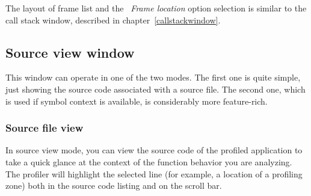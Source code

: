\documentclass[hidelinks,titlepage,a4paper]{article}
\begin{document}
The layout of frame list and the \emph{\faAt{}~Frame location} option selection is similar to the call stack window, described in chapter~\ref{callstackwindow}.

\subsection{Source view window}
\label{sourceview}

This window can operate in one of the two modes. The first one is quite simple, just showing the source code associated with a source file. The second one, which is used if symbol context is available, is considerably more feature-rich.

\subsubsection{Source file view}

In source view mode, you can view the source code of the profiled application to take a quick glance at the context of the function behavior you are analyzing. The profiler will highlight the selected line (for example, a location of a profiling zone) both in the source code listing and on the scroll bar.
\end{document}

